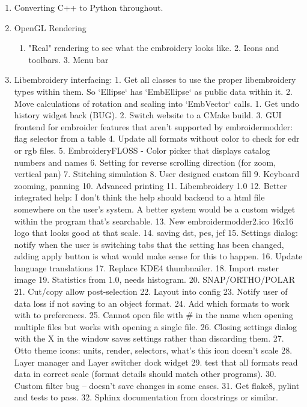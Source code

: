 \documentclass[a4paper, 11pt]{report}
\begin{document}
\begin{enumerate}
\item Converting C++ to Python throughout.
\item OpenGL Rendering
\begin{enumerate}
\item "Real" rendering to see what the embroidery looks like.
    2. Icons and toolbars.
    3. Menu bar
\end{enumerate}
\item Libembroidery interfacing:
    1. Get all classes to use the proper libembroidery types within them.
       So `Ellipse` has `EmbEllipse` as public data within it.
    2. Move calculations of rotation and scaling into `EmbVector` calls.
1. Get undo history widget back (BUG).
2. Switch website to a CMake build.
3. GUI frontend for embroider features that aren't supported by embroidermodder: flag selector from a table
4. Update all formats without color to check for edr or rgb files.
5. EmbroideryFLOSS - Color picker that displays catalog numbers and names
6. Setting for reverse scrolling direction (for zoom, vertical pan)
7. Stitching simulation
8. User designed custom fill
9. Keyboard zooming, panning
10. Advanced printing
11. Libembroidery 1.0
12. Better integrated help: I don't think the help should backend to a html file somewhere on the user's system. A better system would be a custom widget within the program that's searchable.
13. New embroidermodder2.ico 16x16 logo that looks good at that scale.
14. saving dst, pes, jef
15. Settings dialog: notify when the user is switching tabs that the setting has been changed, adding apply button is what would make sense for this to happen.
16. Update language translations
17. Replace KDE4 thumbnailer.
18. Import raster image
19. Statistics from 1.0, needs histogram.
20. SNAP/ORTHO/POLAR
21. Cut/copy allow post-selection
22. Layout into config
23. Notify user of data loss if not saving to an object format.
24. Add which formats to work with to preferences.
25. Cannot open file with \# in the name when opening multiple files but works with opening a single file.
26. Closing settings dialog with the X in the window saves settings rather than discarding them.
27. Otto theme icons: units, render, selectors, what's this icon doesn't scale
28. Layer manager and Layer switcher dock widget
29. test that all formats read data in correct scale (format details should match other programs).
30. Custom filter bug -- doesn't save changes in some cases.
31. Get flake8, pylint and tests to pass.
32. Sphinx documentation from docstrings or similar.
\end{enumerate}
\end{document}
